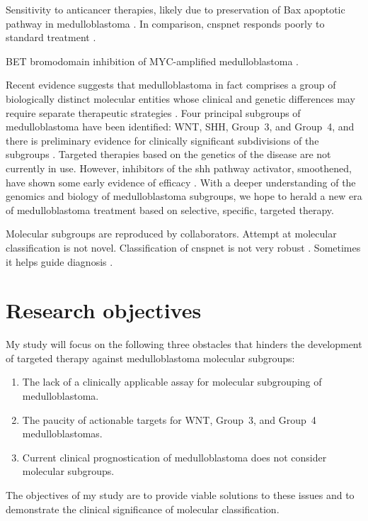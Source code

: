 Sensitivity to anticancer therapies, likely due to preservation of Bax apoptotic pathway in medulloblastoma .
In comparison, \gls{cnspnet} responds poorly to standard treatment .

BET bromodomain inhibition of MYC-amplified medulloblastoma . 


Recent evidence suggests that medulloblastoma in fact comprises a group of biologically distinct molecular entities whose clinical and genetic differences may require separate therapeutic strategies . Four principal subgroups of medulloblastoma have been identified: WNT, SHH, Group~3, and Group~4, and there is preliminary evidence for clinically significant subdivisions of the subgroups . Targeted therapies based on the genetics of the disease are not currently in use. However, inhibitors of the \gls{shh} pathway activator, smoothened, have shown some early evidence of efficacy . With a deeper understanding of the genomics and biology of medulloblastoma subgroups, we hope to herald a new era of medulloblastoma treatment based on selective, specific, targeted therapy.

Molecular subgroups are reproduced by collaborators.
Attempt at molecular classification is not novel. Classification of \gls{cnspnet} is not very robust .
Sometimes it helps guide diagnosis .

\section{Research objectives}

My study will focus on the following three obstacles that hinders the development of targeted therapy against medulloblastoma molecular subgroups:

\begin{enumerate}
	\item The lack of a clinically applicable assay for molecular subgrouping of medulloblastoma.
	\item The paucity of actionable targets for WNT, Group~3, and Group~4 medulloblastomas.
	\item Current clinical prognostication of medulloblastoma does not consider molecular subgroups.
\end{enumerate}

The objectives of my study are to provide viable solutions to these issues and to demonstrate the clinical significance of molecular classification.


